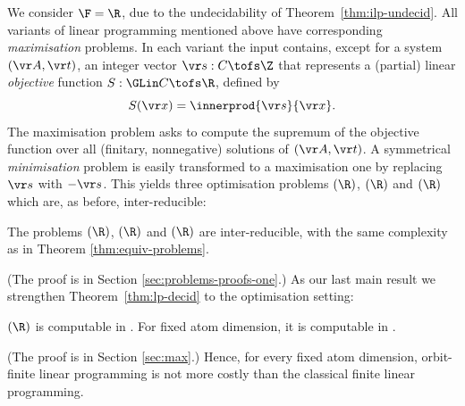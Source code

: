 
We consider $\F = \R$, due to the undecidability of Theorem~\ref{thm:ilp-undecid}.
All variants of linear programming mentioned above have corresponding \emph{maximisation} problems.
In each variant the input contains, except for a system $(\vr A, \vr t)$, 
an integer vector $\vr s : C \tofs \Z$ that represents
a (partial) linear \emph{objective} function $S : \GLin C \tofs \R$, defined by
\[
S(\vr x) = \innerprod{\vr s}{\vr x}.
\]
%
%
The maximisation problem asks to compute the supremum of the objective function over all (finitary, nonnegative)
solutions of $(\vr A, \vr t)$.
A symmetrical \emph{minimisation} problem is easily transformed to a maximisation one by replacing 
$\vr s$ with $-\vr s$.
This yields three optimisation problems 
\ineqmaxname$(\R)$, \finineqmaxname$(\R)$ and \nonnegmaxname$(\R)$ which are,
as before, inter-reducible:
%
%
\begin{theorem} \label{thm:equiv-max}
The problems \ineqmaxname$(\R)$, \finineqmaxname$(\R)$ and \nonnegmaxname$(\R)$
are inter-reducible, with the same complexity as in Theorem \ref{thm:equiv-problems}. 
\end{theorem}
%
(The proof is in Section \ref{sec:problems-proofs-one}.)
As our last main result we strengthen Theorem~\ref{thm:lp-decid} to the optimisation setting:
%
\begin{theorem} \label{thm:lp-max}
\finineqmaxname$(\R)$ is computable in \EXPTIME.
For fixed atom dimension, it is computable in \PTIME.
\end{theorem}
%
(The proof is in Section \ref{sec:max}.)
Hence, for every fixed atom dimension, orbit-finite linear programming is not more costly
than the classical finite linear programming.



